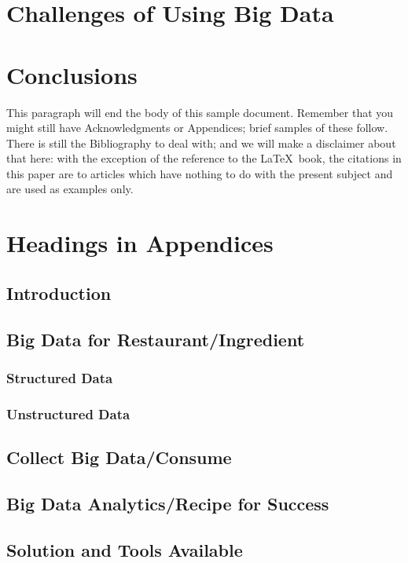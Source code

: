 \documentclass[sigconf]{acmart}
\begin{document}
\section{Challenges of Using Big Data}

\section{Conclusions}

This paragraph will end the body of this sample document.  Remember
that you might still have Acknowledgments or Appendices; brief samples
of these follow.  There is still the Bibliography to deal with; and we
will make a disclaimer about that here: with the exception of the
reference to the \LaTeX\ book, the citations in this paper are to
articles which have nothing to do with the present subject and are
used as examples only.



\appendix

\section{Headings in Appendices}

\subsection{Introduction}
\subsection{Big Data for Restaurant/Ingredient}
\subsubsection{Structured Data}
\subsubsection{Unstructured Data}
\subsection{Collect Big Data/Consume}
\subsection{Big Data Analytics/Recipe for Success}
\subsection{Solution and Tools Available}
\end{document}
